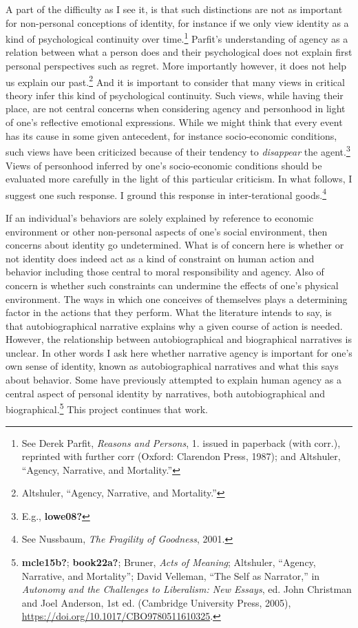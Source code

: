 \documentclass[
  12pt,
]{book}
\theoremstyle{definition}
\theoremstyle{definition}
\theoremstyle{definition}
\theoremstyle{definition}
\theoremstyle{remark}
\begin{document}
A part of the difficulty as I see it, is that such distinctions are not as important for non-personal conceptions of identity, for instance if we only view identity as a kind of psychological continuity over time.\footnote{See Derek Parfit, \emph{Reasons and Persons}, 1. issued in paperback (with corr.), reprinted with further corr (Oxford: Clarendon Press, 1987); and Altshuler, {``Agency, Narrative, and Mortality.''}} Parfit's understanding of agency as a relation between what a person does and their psychological does not explain first personal perspectives such as regret. More importantly however, it does not help us explain our past.\footnote{Altshuler, {``Agency, Narrative, and Mortality.''}} And it is important to consider that many views in critical theory infer this kind of psychological continuity. Such views, while having their place, are not central concerns when considering agency and personhood in light of one's reflective emotional expressions. While we might think that every event has its cause in some given antecedent, for instance socio-economic conditions, such views have been criticized because of their tendency to \emph{disappear} the agent.\footnote{E.g., \textbf{lowe08?}} Views of personhood inferred by one's socio-economic conditions should be evaluated more carefully in the light of this particular criticism. In what follows, I suggest one such response. I ground this response in inter-terational goods.\footnote{See Nussbaum, \emph{The {Fragility} of {Goodness}}, 2001.}

If an individual's behaviors are solely explained by reference to economic environment or other non-personal aspects of one's social environment, then concerns about identity go undetermined. What is of concern here is whether or not identity does indeed act as a kind of constraint on human action and behavior including those central to moral responsibility and agency. Also of concern is whether such constraints can undermine the effects of one's physical environment. The ways in which one conceives of themselves plays a determining factor in the actions that they perform. What the literature intends to say, is that autobiographical narrative explains why a given course of action is needed. However, the relationship between autobiographical and biographical narratives is unclear. In other words I ask here whether narrative agency is important for one's own sense of identity, known as autobiographical narratives and what this says about behavior. Some have previously attempted to explain human agency as a central aspect of personal identity by narratives, both autobiographical and biographical.\footnote{\textbf{mcle15b?}; \textbf{book22a?}; Bruner, \emph{Acts of Meaning}; Altshuler, {``Agency, Narrative, and Mortality''}; David Velleman, {``The {Self} as {Narrator},''} in \emph{Autonomy and the {Challenges} to {Liberalism}: {New Essays}}, ed. John Christman and Joel Anderson, 1st ed. (Cambridge University Press, 2005), \url{https://doi.org/10.1017/CBO9780511610325}.} This project continues that work.
\end{document}
